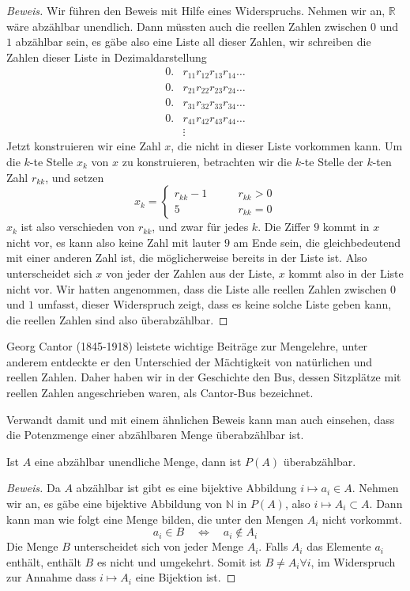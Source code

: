 \begin{proof}[Beweis]
Wir führen den Beweis mit Hilfe eines Widerspruchs. Nehmen wir
an, $\mathbb R$ wäre abzählbar unendlich. Dann müssten auch
die reellen Zahlen zwischen $0$ und $1$ abzählbar sein,  es gäbe also eine
Liste all dieser Zahlen, wir schreiben die Zahlen
dieser Liste in Dezimaldarstellung
\begin{align*}
0.&r_{11}r_{12}r_{13}r_{14}\dots\\
0.&r_{21}r_{22}r_{23}r_{24}\dots\\
0.&r_{31}r_{32}r_{33}r_{34}\dots\\
0.&r_{41}r_{42}r_{43}r_{44}\dots\\
&\vdots
\end{align*}
Jetzt konstruieren wir eine Zahl $x$, die nicht in dieser Liste vorkommen
kann. Um die $k$-te Stelle $x_k$ von $x$ zu konstruieren, betrachten
wir die $k$-te Stelle der $k$-ten Zahl $r_{kk}$, und setzen
\[
x_k=\begin{cases}
r_{kk}-1&\qquad r_{kk}>0\\
5&\qquad r_{kk}=0
\end{cases}
\]
$x_k$ ist also verschieden von $r_{kk}$, und zwar für jedes $k$.
Die Ziffer $9$ kommt in $x$ nicht vor, es kann also keine Zahl
mit lauter $9$ am Ende sein, die gleichbedeutend mit einer anderen
Zahl ist, die möglicherweise bereits in der Liste ist.
Also unterscheidet sich $x$ von jeder der Zahlen aus der Liste, $x$
kommt also in der Liste nicht vor. Wir hatten angenommen, dass die
Liste alle reellen Zahlen zwischen $0$ und $1$ umfasst, dieser
Widerspruch zeigt, dass es keine solche Liste geben kann, die
reellen Zahlen sind also überabzählbar.
\end{proof}

%
Georg Cantor (1845-1918) leistete wichtige Beiträge zur Mengelehre,
unter anderem entdeckte er den Unterschied der Mächtigkeit von
natürlichen und reellen Zahlen. Daher haben wir in der Geschichte
den Bus, dessen Sitzplätze mit reellen Zahlen angeschrieben waren,
als Cantor-Bus bezeichnet.

Verwandt damit und mit einem ähnlichen Beweis kann man auch einsehen,
dass die Potenzmenge einer abzählbaren Menge überabzählbar ist.

\begin{satz}\label{powersetuncountable}
Ist $A$ eine abzählbar unendliche Menge, dann ist $P(A)$
überabzählbar.
\end{satz}

\begin{proof}[Beweis]
Da $A$ abzählbar ist gibt es eine bijektive Abbildung
$i\mapsto a_i\in A$. Nehmen wir an, es gäbe eine bijektive
Abbildung von $\mathbb N$ in $P(A)$, also $i\mapsto A_i\subset A$.
Dann kann man wie folgt eine Menge bilden, die unter den Mengen
$A_i$ nicht vorkommt.
\[
a_i\in B\quad\Leftrightarrow\quad a_i\not\in A_i
\]
Die Menge $B$ unterscheidet sich von jeder Menge $A_i$. Falls
$A_i$ das Elemente $a_i$ enthält, enthält $B$ es nicht und
umgekehrt. Somit ist $B\ne A_i\forall i$, im Widerspruch zur Annahme
dass $i\mapsto A_i$ eine Bijektion ist.
\end{proof}

